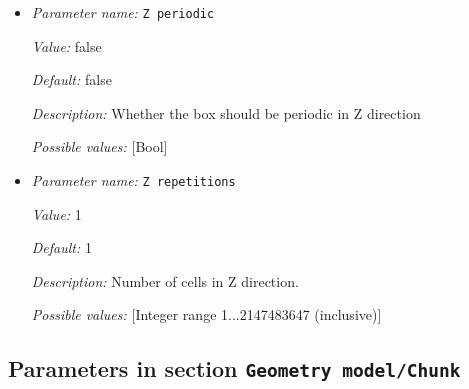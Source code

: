 \begin{itemize}
{\it Value:} 1


{\it Default:} 1


{\it Description:} Extent of the box in z-direction. This value is ignored if the simulation is in 2d. Units: m.


{\it Possible values:} [Double 0...1.79769e+308 (inclusive)]
\item {\it Parameter name:} {\tt Z periodic}
\label{parameters:Geometry model/Box/Z periodic}


{\it Value:} false


{\it Default:} false


{\it Description:} Whether the box should be periodic in Z direction


{\it Possible values:} [Bool]
\item {\it Parameter name:} {\tt Z repetitions}
\label{parameters:Geometry model/Box/Z repetitions}


{\it Value:} 1


{\it Default:} 1


{\it Description:} Number of cells in Z direction.


{\it Possible values:} [Integer range 1...2147483647 (inclusive)]
\end{itemize}

\subsection{Parameters in section \tt Geometry model/Chunk}
\label{parameters:Geometry_20model/Chunk}


